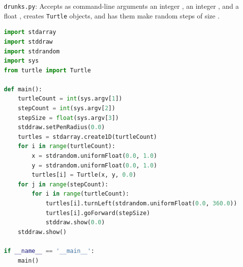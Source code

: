 \documentclass[8pt,a4paper,compress,handout]{beamer}
\begin{document}
\begin{frame}[fragile]
\begin{framed}
\tiny \lstinline{drunks.py}: Accepts as command-line arguments an integer , an integer , and a float , creates  \lstinline{Turtle} objects, and has them make  random steps of size .
\end{framed}

\begin{lstlisting}[language=Python]
import stdarray
import stddraw
import stdrandom
import sys
from turtle import Turtle

def main():
    turtleCount = int(sys.argv[1])
    stepCount = int(sys.argv[2])
    stepSize = float(sys.argv[3])
    stddraw.setPenRadius(0.0)
    turtles = stdarray.create1D(turtleCount)
    for i in range(turtleCount):
        x = stdrandom.uniformFloat(0.0, 1.0)
        y = stdrandom.uniformFloat(0.0, 1.0)
        turtles[i] = Turtle(x, y, 0.0)
    for j in range(stepCount):
        for i in range(turtleCount):
            turtles[i].turnLeft(stdrandom.uniformFloat(0.0, 360.0))
            turtles[i].goForward(stepSize)
            stddraw.show(0.0)
    stddraw.show()
    
if __name__ == '__main__':
    main()
\end{lstlisting}
\end{frame}
\end{document}
